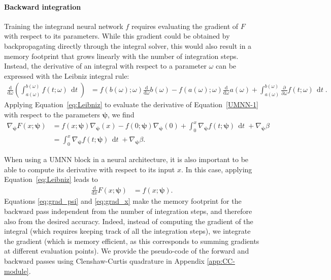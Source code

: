 \documentclass{article}
\newcommand{\mb}{\boldsymbol}
\DeclareMathOperator{\dt}{\, \mathrm{d}\mathit{t}}
\newcommand{\brac}[1]{\left({#1}\right)}
\begin{document}
\paragraph{Backward integration}
Training the integrand neural network $f$ requires evaluating the gradient of $F$ with respect to its parameters. While this gradient could be obtained by backpropagating directly through the integral solver, this would also result in a memory footprint that grows linearly with the number of integration steps. Instead, the derivative of an integral with respect to a parameter $\omega$ can be expressed with the Leibniz integral rule:
\begin{align}
    \frac{\mathrm{d}}{\mathrm{d} \omega}\brac{\int^{b(\omega)}_{a(\omega)}f(t; \omega) \dt} &= f(b(\omega); \omega) \frac{\mathrm{d}}{\mathrm{d} \omega}b(\omega) - f(a(\omega);\omega) \frac{\mathrm{d}}{\mathrm{d}\omega}a(\omega) + \int^{b(\omega)}_{a(\omega)} \frac{\partial}{\partial \omega}f(t; \omega) \dt. \label{eq:Leibniz}
\end{align}
Applying Equation~\eqref{eq:Leibniz} to evaluate the derivative of Equation~\eqref{UMNN-1} with respect to the parameters $\mb{\psi}$, we find
\begin{align}
    \nabla_{\mb{\psi}} F(x; \mb{\psi}) &= f(x; \mb{\psi}) \nabla_{\mb{\psi}}\brac{x} - f(0; \mb{\psi}) \nabla_{\mb{\psi}}\brac{0} + \int^x_0 \nabla_{\mb{\psi}} f(t; \mb{\psi}) \dt + \nabla_{\mb{\psi}}\beta\nonumber \\
    &= \int^x_0 \nabla_{\mb{\psi}} f(t; \mb{\psi}) \dt + \nabla_{\mb{\psi}}\beta. \label{eq:grad_psi}
\end{align}

When using a UMNN block in a neural architecture, it is also important to be able to compute its derivative with respect to its input $x$. In this case, applying Equation~\eqref{eq:Leibniz} leads to
\begin{align}
    \frac{\mathrm{d}}{\mathrm{d}x}F(x; \mb{\psi}) &= f(x; \mb{\psi}).\label{eq:grad_x}
\end{align}
Equations \eqref{eq:grad_psi} and \eqref{eq:grad_x} make the memory footprint for the backward pass independent from the number of integration steps, and therefore also from the desired accuracy. Indeed, instead of computing the gradient of the integral (which requires keeping track of all the integration steps), we integrate the gradient (which is memory efficient, as this corresponds to summing gradients at different evaluation points). We provide the pseudo-code of the forward and backward passes using Clenshaw-Curtis quadrature in Appendix \ref{app:CC-module}.
\end{document}

